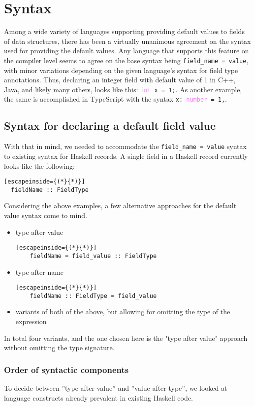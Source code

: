 \documentclass[en]{pracamgr}
\begin{document}
\chapter{Syntax}
Among a wide variety of languages supporting providing default values to fields of data structures, there has been a virtually unanimous agreement on the syntax used for providing the default values.
Any language that supports this feature on the compiler level seems to agree on the base syntax being \texttt{field\_name = value}, with minor variations depending on the given language's syntax for field type annotations.
Thus, declaring an integer field with default value of 1 in C++, Java, and likely many others, looks like this: \texttt{\textcolor{Violet}{int} x = \textcolor{BrickRed}{1};}.
As another example, the same is accomplished in TypeScript with the syntax \texttt{x:\ \textcolor{Violet}{number} = \textcolor{BrickRed}{1},}.

\section{Syntax for declaring a default field value}
With that in mind, we needed to accommodate the \texttt{field\_name = value} syntax to existing syntax for Haskell records.
A single field in a Haskell record currently looks like the following:
\begin{lstlisting}[escapeinside={(*}{*)}]
  fieldName :: FieldType
\end{lstlisting}
Considering the above examples, a few alternative approaches for the default value syntax come to mind.

\begin{itemize}
  \item type after value
  \begin{lstlisting}[escapeinside={(*}{*)}]
    fieldName = field_value :: FieldType
  \end{lstlisting}
  \item type after name
  \begin{lstlisting}[escapeinside={(*}{*)}]
    fieldName :: FieldType = field_value
  \end{lstlisting}
  \item variants of both of the above, but allowing for omitting the type of the expression
\end{itemize}

In total four variants, and the one chosen here is the "type after value" approach without omitting the type signature.
\subsection{Order of syntactic components}
To decide between ''type after value'' and ''value after type'', we looked at language constructs already prevalent in existing Haskell code.
\end{document}
